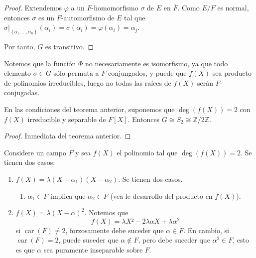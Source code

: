 \documentclass[12pt]{report}
\theoremstyle{largebreak}
\DeclareMathOperator{\car}{car}
\begin{document}
\begin{proof}
        Extendemos $\varphi$ a un $F$-homomorfismo $\sigma$ de $E$ en $\overline{F}$. Como $E/F$ es normal, entonces $\sigma$ es un $F$-automorfismo de $E$ tal que $\sigma\big|_{\left\{\alpha_1,...,\alpha_n\right\}}(\alpha_i)=\sigma(\alpha_i)=\varphi(\alpha_i)=\alpha_j$.

        Por tanto, $G$ es transitivo.
    \end{proof}

    \begin{obs}
        Notemos que la función $\Phi$ no necesariamente es isomorfismo, ya que todo elemento $\sigma\in G$ sólo permuta a $F$-conjungados, y puede que $f(X)$ sea producto de polinomios irreducibles, luego no todas las raíces de $f(X)$ serán $F$-conjugadas.
    \end{obs}

    \begin{propo}
        En las condiciones del teorema anterior, suponemos que $\deg(f(X))=2$ con $f(X)$ irreducible y separable de $F[X]$. Entonces $G\cong S_2\cong\mathbb{Z}/2\mathbb{Z}$.
    \end{propo}

    \begin{proof}
        Inmediata del teorema anterior.
    \end{proof}

    \begin{exa}
        Considere un campo $F$ y sea $f(X)$ el polinomio tal que $\deg(f(X))=2$. Se tienen dos casos:
        \begin{enumerate}
            \item $f(X)=\lambda(X-\alpha_1)(X-\alpha_2)$. Se tienen dos casos.
            \begin{enumerate}
                \item $\alpha_1\in F$ implica que $\alpha_2\in F$ (vea le desarrollo del producto en $f(X)$).
            \end{enumerate}
            \item $f(X)=\lambda(X-\alpha)^2$. Notemos que
            \begin{equation*}
                f(X)=\lambda X²-2\lambda\alpha X+\lambda\alpha^2
            \end{equation*}
            si $\car(F)\neq2$, forzosamente debe suceder que $\alpha\in F$. En cambio, si $\car(F)=2$, puede suceder que $\alpha\notin F$, pero debe suceder que $\alpha^2\in F$, esto es que $\alpha$ sea puramente inseparable sobre $F$.
        \end{enumerate}
    \end{exa}
    
\end{document}
